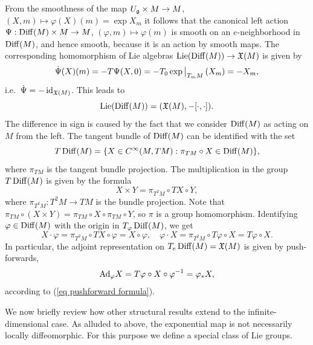 \begin{example}
    From the smoothness of the map $U_{\mathfrak{g}}\times M\to M$, $(X,m)\mapsto \varphi(X)(m)=\exp X_m$ it follows that the canonical left action $\Psi:\operatorname{Diff}(M)\times M\to M$, $(\varphi,m)\mapsto \varphi(m)$ is smooth on an $e$-neighborhood in $\operatorname{Diff}(M)$, and hence smooth, because it is an action by smooth maps. The corresponding homomorphism of Lie algebras $\operatorname{Lie}(\operatorname{Diff}(M))\to \mathfrak{X}(M)$ is given by
    \[\dot\Psi(X)(m)=-T\Psi (X,0)=-T_{0}\restr{\exp}{T_m M}(X_m)=-X_m,\]
    i.e.\ $\dot\Psi=-\operatorname{id}_{\mathfrak{X}(M)}$. This leads to
    \[\operatorname{Lie} (\operatorname{Diff}(M))=(\mathfrak{X}(M),-[\cdot,\cdot]).\]
    The difference in sign is caused by the fact that we consider $\operatorname{Diff}(M)$ as acting on $M$ from the left. The tangent bundle of $\operatorname{Diff}(M)$ can be identified with the set
    \[T\operatorname{Diff}(M)=\{X\in C^\infty(M,TM):\pi_{TM}\circ X\in \operatorname{Diff}(M)\},\]
    where $\pi_{TM}$ is the tangent bundle projection. The multiplication in the group $T\operatorname{Diff}(M)$ is given by the formula
    \[X\times Y=\pi_{T^2M}\circ TX\circ Y,\]
    where $\pi_{T^2M}:T^2M\to TM$ is the bundle projection. Note that $\pi_{TM}\circ (X\times Y)=\pi_{TM}\circ X\circ \pi_{TM}\circ Y$, so $\pi$ is a group homomorphism. Identifying $\varphi\in\operatorname{Diff}(M)$ with the origin in $T_\varphi\operatorname{Diff}(M)$, we get 
    \[X\cdot \varphi=\pi_{T^2M}\circ TX\circ \varphi=X\circ \varphi,\quad \varphi\cdot X=\pi_{T^2M}\circ T\varphi\circ X=T\varphi\circ X.\]
    In particular, the adjoint representation on $T_e\operatorname{Diff}(M)=\mathfrak{X}(M)$ is given by push-forwards,
    \[\mathrm{Ad}_\varphi X=T\varphi\circ X\circ \varphi^{-1}=\varphi_\ast X,\]
    according to (\ref{eq pushforward formula}).
\end{example}


We now briefly review how other structural results extend to the infinite-dimensional case. As alluded to above, the exponential map is not necessarily locally diffeomorphic. For this purpose we define a special class of Lie groups.

